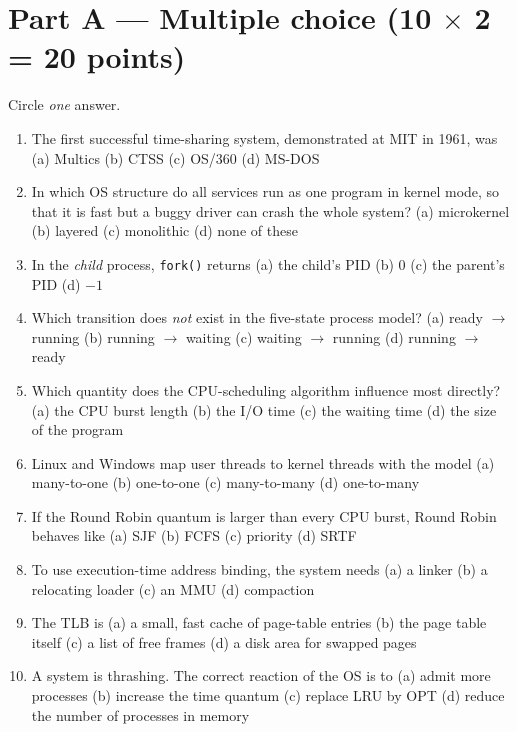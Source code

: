 \documentclass[11pt,a4paper]{article}
\newcommand{\cmd}[1]{\texttt{#1}}
\begin{document}
\section*{Part A --- Multiple choice \hfill (10 $\times$ 2 = 20 points)}
Circle \emph{one} answer.
\begin{enumerate}[leftmargin=2.0em,label=A\arabic*.,itemsep=0.15em]
  \item The first successful time-sharing system, demonstrated at MIT in 1961, was \quad (a) Multics \quad (b) CTSS \quad (c) OS/360 \quad (d) MS-DOS
  \item In which OS structure do all services run as one program in kernel mode, so that it is fast but a buggy driver can crash the whole system? \quad (a) microkernel \quad (b) layered \quad (c) monolithic \quad (d) none of these
  \item In the \emph{child} process, \cmd{fork()} returns \quad (a) the child's PID \quad (b) $0$ \quad (c) the parent's PID \quad (d) $-1$
  \item Which transition does \emph{not} exist in the five-state process model? \quad (a) ready $\to$ running \quad (b) running $\to$ waiting \quad (c) waiting $\to$ running \quad (d) running $\to$ ready
  \item Which quantity does the CPU-scheduling algorithm influence most directly? \quad (a) the CPU burst length \quad (b) the I/O time \quad (c) the waiting time \quad (d) the size of the program
  \item Linux and Windows map user threads to kernel threads with the model \quad (a) many-to-one \quad (b) one-to-one \quad (c) many-to-many \quad (d) one-to-many
  \item If the Round Robin quantum is larger than every CPU burst, Round Robin behaves like \quad (a) SJF \quad (b) FCFS \quad (c) priority \quad (d) SRTF
  \item To use execution-time address binding, the system needs \quad (a) a linker \quad (b) a relocating loader \quad (c) an MMU \quad (d) compaction
  \item The TLB is \quad (a) a small, fast cache of page-table entries \quad (b) the page table itself \quad (c) a list of free frames \quad (d) a disk area for swapped pages
  \item A system is thrashing. The correct reaction of the OS is to \quad (a) admit more processes \quad (b) increase the time quantum \quad (c) replace LRU by OPT \quad (d) reduce the number of processes in memory
\end{enumerate}
\end{document}
